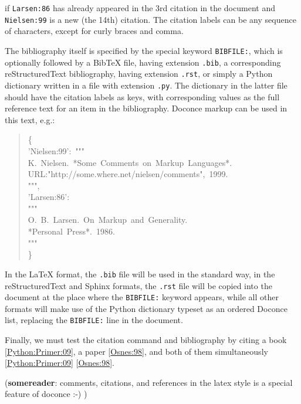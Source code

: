 \documentclass[a4paper,english]{article}
\begin{document}
if \texttt{Larsen:86} has already appeared in the 3rd citation in the document
and \texttt{Nielsen:99} is a new (the 14th) citation. The citation labels
can be any sequence of characters, except for curly braces and comma.

The bibliography itself is specified by the special keyword \texttt{BIBFILE:},
which is optionally followed by a BibTeX file, having extension \texttt{.bib},
a corresponding reStructuredText bibliography, having extension \texttt{.rst},
or simply a Python dictionary written in a file with extension \texttt{.py}.
The dictionary in the latter file should have the citation labels as
keys, with corresponding values as the full reference text for an item
in the bibliography. Doconce markup can be used in this text, e.g.:
%
\begin{quote}{\ttfamily \raggedright \noindent
\{\\
'Nielsen:99':~"{}"{}"\\
K.~Nielsen.~*Some~Comments~on~Markup~Languages*.\\
URL:"http://some.where.net/nielsen/comments",~1999.\\
"{}"{}",\\
'Larsen:86':\\
"{}"{}"\\
O.~B.~Larsen.~On~Markup~and~Generality.\\
*Personal~Press*.~1986.\\
"{}"{}"\\
\}
}
\end{quote}

In the LaTeX format, the \texttt{.bib} file will be used in the standard way,
in the reStructuredText and Sphinx formats, the \texttt{.rst} file will be
copied into the document at the place where the \texttt{BIBFILE:} keyword
appears, while all other formats will make use of the Python dictionary
typeset as an ordered Doconce list, replacing the \texttt{BIBFILE:} line
in the document.

Finally, we must test the citation command and bibliography by
citing a book [\hyperlink{python-primer-09}{Python:Primer:09}], a paper [\hyperlink{osnes-98}{Osnes:98}],
and both of them simultaneously [\hyperlink{python-primer-09}{Python:Primer:09}] [\hyperlink{osnes-98}{Osnes:98}].

(\textbf{somereader}: comments, citations, and references in the latex style
is a special feature of doconce :-) )


\end{document}
